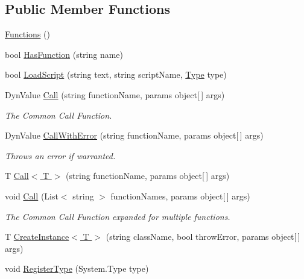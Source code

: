 \subsection*{Public Member Functions}
\begin{DoxyCompactItemize}
\item 
\hyperlink{class_functions_af3dc73628755a9edc419081bdaddba40}{Functions} ()
\item 
bool \hyperlink{class_functions_a76e2be7aabf4daac93ec85056f9439c9}{Has\+Function} (string name)
\item 
bool \hyperlink{class_functions_a44ec162e65030c8e050b7217825c06e4}{Load\+Script} (string text, string script\+Name, \hyperlink{class_functions_a652bc8a0dcb6afd360459f15e2d9bdf4}{Type} type)
\item 
Dyn\+Value \hyperlink{class_functions_ae33add32d22cc0eea74eaca446e03111}{Call} (string function\+Name, params object\mbox{[}$\,$\mbox{]} args)
\begin{DoxyCompactList}\small\item\em The Common Call Function. \end{DoxyCompactList}\item 
Dyn\+Value \hyperlink{class_functions_a920863b00e31bb1c7c24e838d9639016}{Call\+With\+Error} (string function\+Name, params object\mbox{[}$\,$\mbox{]} args)
\begin{DoxyCompactList}\small\item\em Throws an error if warranted. \end{DoxyCompactList}\item 
T \hyperlink{class_functions_a6dd52370fc31e2190479683765fff302}{Call$<$ T $>$} (string function\+Name, params object\mbox{[}$\,$\mbox{]} args)
\item 
void \hyperlink{class_functions_a32d1bcb840da0bfa692dfa5fc7bfff06}{Call} (List$<$ string $>$ function\+Names, params object\mbox{[}$\,$\mbox{]} args)
\begin{DoxyCompactList}\small\item\em The Common Call Function expanded for multiple functions. \end{DoxyCompactList}\item 
T \hyperlink{class_functions_a9e6e97f260832a313e636662a08b0311}{Create\+Instance$<$ T $>$} (string class\+Name, bool throw\+Error, params object\mbox{[}$\,$\mbox{]} args)
\item 
void \hyperlink{class_functions_a80433db8540228fe69d49c3dfcb94660}{Register\+Type} (System.\+Type type)
\end{DoxyCompactItemize}
